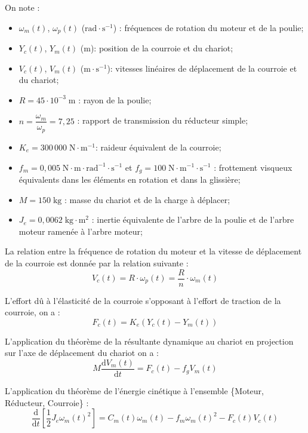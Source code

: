 \documentclass[10pt,fleqn]{article} %
\begin{document}
\begin{multicols}{2}
On note : 
\begin{itemize}[label=$\blacksquare$,font=\tiny]
\item $\omega_m(t)$, $\omega_p(t)$ ($\text{rad}\cdot \text{s}^{-1}$) : fréquences de rotation du moteur et de la poulie;
\item $Y_c(t)$, $Y_m(t)$ ($\text{m}$): position de la courroie et du chariot;
\item $V_c(t)$, $V_m(t)$ ($\text{m}\cdot \text{s}^{-1}$): vitesses linéaires de déplacement de la courroie et du chariot;
\item $R =45\cdot 10^{-3} \; \text{m}$ : rayon de la poulie;
\item $n=\dfrac{\omega_m}{\omega_p} = 7,25$ : rapport de transmission du réducteur simple;
\item $K_e = 300\, 000 \; \text{N}\cdot \text{m}^{-1} $: raideur équivalent de la courroie;
\item $f_m = 0,005\; \text{N}\cdot\text{m}\cdot\text{rad}^{-1}\cdot\text{s}^{-1}$ et $f_g = 100\; \text{N}\cdot\text{m}^{-1}\cdot\text{s}^{-1}$ : frottement visqueux équivalents dans les éléments en rotation et dans la glissière;
\item $M = 150 \; \text{kg}$ : masse du chariot et de la charge à déplacer;
\item $J_e = 0,0062 \; \text{kg} \cdot \text{m}^2 $ : inertie équivalente de l'arbre de la poulie et de l'arbre moteur ramenée à l'arbre moteur;
\end{itemize}


La relation entre la fréquence de rotation du moteur et la vitesse de déplacement de la courroie est donnée par la relation suivante :
\begin{equation}
V_c(t) = R \cdot  \omega_p(t) = \dfrac{R}{n} \cdot \omega_m(t)
\end{equation}



L'effort dû à l'élasticité de la courroie s'opposant à l'effort de traction de la courroie, on a :
\begin{equation}
F_c(t) = K_e \left(Y_c(t) - Y_m(t) \right)
\end{equation}

L'application du théorème de la résultante dynamique au chariot en projection sur l'axe de déplacement du chariot on a : 
\begin{equation}
M\dfrac{\text{d}V_m(t)}{\text{d}t} = F_c(t) - f_g V_m(t)
\end{equation}

L'application du théorème de l'énergie cinétique à l'ensemble \{Moteur, Réducteur, Courroie\} :
\begin{equation}
\dfrac{\text{d}}{\text{d}t}\left[ \dfrac{1}{2} J_e \omega_m(t)^2 \right] =  C_m(t) \omega_m(t) - f_m\omega_m(t)^2 - F_c(t) V_c(t) 
\end{equation}


\end{multicols}
\end{document}
